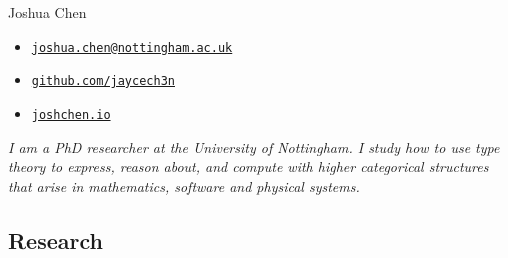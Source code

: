 \documentclass[12pt,a4paper]{article}
\author{}
\date{}
\providecommand{\tightlist}{%
  \setlength{\itemsep}{0pt}\setlength{\parskip}{0pt}}
\begin{document}
\newcommand{\httpsurl}[1]{\href{https://{#1}}{\nolinkurl{#1}}}

\thispagestyle{fancy}

{\sc\huge Joshua Chen}
\vspace{1.5ex}
\begin{itemize}
\tightlist
\item[\small\faPaperPlane] \href{mailto:joshua.chen@nottingham.ac.uk}{\nolinkurl{joshua.chen@nottingham.ac.uk}}
\item[\small\faGithub] \httpsurl{github.com/jaycech3n}
\item[\small\faGlobe] \httpsurl{joshchen.io}
\end{itemize}
\vspace{1.5ex}
\textit{I am a PhD researcher at the University of Nottingham.
I study how to use type theory to express, reason about, and compute with higher categorical structures that arise in mathematics, software and physical systems.}

\subsection{Research}

\newcommand{\pdficon}{{\scriptsize\faFilePdf[regular]}}
\newcommand{\pdf}[1]{\pdficon\hspace{0.8ex}\httpsurl{#1}}
\end{document}
